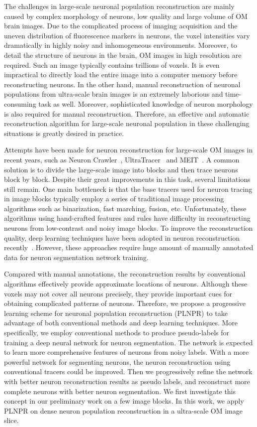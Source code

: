 The challenges in large-scale neuronal population reconstruction are mainly caused by complex morphology of neurons, low quality and large volume of OM brain images.
Due to the complicated process of imaging acquisition and the uneven distribution of fluorescence markers in neurons, the voxel intensities vary dramatically in highly noisy and inhomogeneous environments.
Moreover, to detail the structure of neurons in the brain, OM images in high resolution are required. Such an image typically contains trillions of voxels. It is even impractical to directly load the entire image into a computer memory before reconstructing neurons.
In the other hand, manual reconstruction of neuronal populations from ultra-scale brain images is an extremely laborious and time-consuming task as well.
Moreover, sophisticated knowledge of neuron morphology is also required for manual reconstruction.
%
Therefore, an effective and automatic reconstruction algorithm for large-scale neuronal population in these challenging situations is greatly desired in practice.
 
 
Attempts have been made for neuron reconstruction for large-scale OM images in recent years, such as Neuron Crawler~\cite{Zhou2015}, UltraTracer~\cite{Peng2017} and MEIT~\cite{Wang2018}.
A common solution is to divide the large-scale image into blocks and then trace neurons block by block.
Despite their great improvements in this task, several limitations still remain.
%
One main bottleneck is that the base tracers used for neuron tracing in image blocks typically employ a series of traditional image processing algorithms such as binarization, fast marching, fusion, etc. 
Unfortunately, these algorithms using hand-crafted features and rules have difficulty in reconstructing neurons from low-contrast and noisy image blocks.
To improve the reconstruction quality, deep learning techniques have been adopted in neuron reconstruction recently~\cite{Xu2016, Li2017, Zhou2018, Kozinski-MIA2020}. 
However, these approaches require huge amount of manually annotated data for neuron segmentation network training.
%

Compared with manual annotations, the reconstruction results by conventional algorithms effectively provide approximate locations of neurons. 
Although these voxels may not cover all neurons precisely, they provide important cues for obtaining complicated patterns of neurons.
Therefore, we propose a progressive learning scheme for neuronal population reconstruction (PLNPR) to take advantage of both conventional methods and deep learning techniques.
More specifically, we employ conventional methods to produce pseudo-labels for training a deep neural network for neuron segmentation. 
The network is expected to learn more comprehensive features of neurons from noisy labels. 
With a more powerful network for segmenting neurons, the neuron reconstruction using conventional tracers could be improved. 
Then we progressively refine the network with better neuron reconstruction results as pseudo labels, and reconstruct more complete neurons with better neuron segmentation.
We first investigate this concept in our preliminary work \cite{Zhao2019} on a few image blocks. 
In this work, we apply PLNPR on dense neuron population reconstruction in a ultra-scale OM image slice. 

